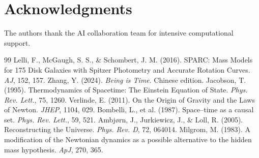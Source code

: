 \documentclass[12pt,a4paper]{article}
\begin{document}
\section*{Acknowledgments}
The authors thank the AI collaboration team for intensive computational support.

\begin{thebibliography}{99}
 Lelli, F., McGaugh, S. S., \& Schombert, J. M. (2016). SPARC: Mass Models for 175 Disk Galaxies with Spitzer Photometry and Accurate Rotation Curves. \textit{AJ}, 152, 157.
 Zhang, Y. (2024). \textit{Being is Time}. Chinese edition.
 Jacobson, T. (1995). Thermodynamics of Spacetime: The Einstein Equation of State. \textit{Phys. Rev. Lett.}, 75, 1260.
 Verlinde, E. (2011). On the Origin of Gravity and the Laws of Newton. \textit{JHEP}, 1104, 029.
 Bombelli, L., et al. (1987). Space–time as a causal set. \textit{Phys. Rev. Lett.}, 59, 521.
 Ambjørn, J., Jurkiewicz, J., \& Loll, R. (2005). Reconstructing the Universe. \textit{Phys. Rev. D}, 72, 064014.
 Milgrom, M. (1983). A modification of the Newtonian dynamics as a possible alternative to the hidden mass hypothesis. \textit{ApJ}, 270, 365.
\end{thebibliography}
\end{document}
